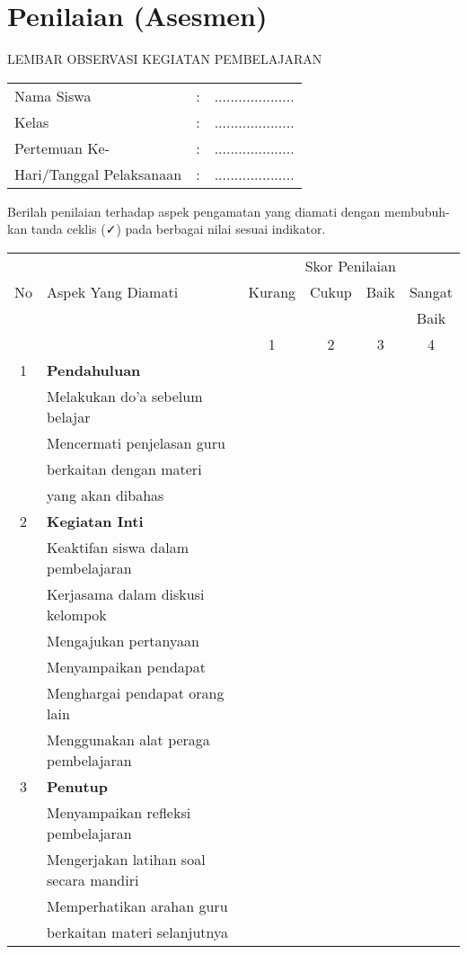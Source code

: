 \documentclass[a5paper,10pt,openany]{book}
\begin{document}
\section{Penilaian (Asesmen)}

{\color{NavyBlue}
	\begin{center}
		\large LEMBAR OBSERVASI KEGIATAN PEMBELAJARAN
	\end{center}
	\begin{tabular}{p{4cm}p{.15cm}p{4cm}}
		Nama Siswa&:& ....................\\
		Kelas&:& ....................\\
		Pertemuan Ke-&:& ....................\\
		Hari/Tanggal Pelaksanaan&:& ....................\\
\end{tabular}

\vspace{.3cm}
Berilah penilaian terhadap aspek pengamatan yang diamati dengan membubuh-\\kan tanda ceklis (\faCheck) pada berbagai nilai sesuai indikator.\\

\begin{tabular}{|c|l|c|c|c|c|}
\hline
\multirow{3}{*}{No}&\multirow{3}{*}{Aspek Yang Diamati}&\multicolumn{4}{|c|}{Skor Penilaian}\\
\cline{3-6}
&&Kurang&Cukup&Baik&Sangat\\&&&&&Baik\\
\cline{3-6}
&&1&2&3&4\\
\hline
1&\textbf{Pendahuluan}&&&&\\
\hline
&Melakukan do’a sebelum belajar&&&&\\
\hline
&Mencermati penjelasan guru&&&&\\&berkaitan dengan materi&&&& \\&yang akan dibahas&&&& \\
\hline
2&\textbf{Kegiatan Inti}&&&&\\
\hline
&Keaktifan siswa dalam pembelajaran&&&&\\
\hline
&Kerjasama dalam diskusi kelompok&&&&\\
\hline
&Mengajukan pertanyaan&&&&\\
\hline
&Menyampaikan pendapat&&&&\\
\hline
&Menghargai pendapat orang lain&&&&\\
\hline
&Menggunakan alat peraga pembelajaran&&&&\\
\hline
3&\textbf{Penutup}&&&&\\
\hline
&Menyampaikan refleksi pembelajaran&&&&\\
\hline
&Mengerjakan latihan soal secara mandiri&&&&\\
\hline
&Memperhatikan arahan guru&&&&\\& berkaitan materi selanjutnya&&&&\\
\hline
\end{tabular}

}
\end{document}
